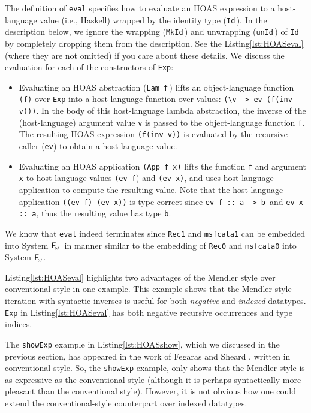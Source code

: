 \documentclass[a4paper,UKenglish]{lipics}
\newcommand{\ie}[0]{{i.e.}}
\newcommand{\Fw}[0]{{\ensuremath{\mathsf{\uppercase{F}}_{\!\omega}}}}
\begin{document}
The definition of \lstinline{eval} specifies how to evaluate
an HOAS expression to a host-language value (\ie, Haskell) wrapped by
the identity type (\lstinline{Id}\,). In the description below, we ignore
the wrapping (\lstinline{MkId}\,) and unwrapping (\lstinline{unId}\,) of
\lstinline{Id} by completely dropping them from the description.
See the Listing\;\ref{lst:HOASeval} (where they are not omitted)
if you care about these details. We discuss the evaluation for each of
the constructors of \lstinline{Exp}:
\begin{itemize}
	\item Evaluating an HOAS abstraction (\lstinline{Lam f}\,) lifts
		an object-language function \lstinline{(f)} over \lstinline{Exp}
		into a host-language function over values:
		\lstinline{(\v -> ev (f(inv v)))}.
		In the body of this host-language lambda abstraction,
		the inverse of the (host-language) argument value \lstinline{v}
		is passed to the object-language function \lstinline{f}.
		The resulting HOAS expression \lstinline{(f(inv v))} is
		evaluated by the recursive caller (\lstinline{ev}) to
		obtain a host-language value.

	\item Evaluating an HOAS application \lstinline{(App f x)} lifts
		the function \lstinline{f} and argument \lstinline{x} to
		host-language values \lstinline{(ev f}) and \lstinline{(ev x)},
		and uses host-language application to compute
		the resulting value. Note that the host-language application
		\lstinline{((ev f) (ev x))} is type correct since
		\lstinline{ev f :: a -> b}\, and \lstinline{ev x :: a},
		thus the resulting value has type \lstinline{b}.
\end{itemize}
We know that \lstinline{eval} indeed terminates since \lstinline{Rec1} and
\lstinline{msfcata1} can be embedded into System \Fw\ in manner similar to
the embedding of \lstinline{Rec0} and \lstinline{msfcata0} into System \Fw.

Listing\;\ref{lst:HOASeval} highlights two advantages of the Mendler style over
conventional style in one example. This example shows that the Mendler-style
iteration with syntactic inverses is useful for both \textit{negative} and
\textit{indexed} datatypes. \lstinline{Exp} in Listing\;\ref{lst:HOASeval} has
both negative recursive occurrences and type indices.

The \lstinline{showExp} example in Listing\;\ref{lst:HOASshow},
which we discussed in the previous section, has appeared in the work
of Fegaras and Sheard \cite{FegShe96}, written in conventional style.
So, the \lstinline{showExp} example, only shows that the Mendler style is
as expressive as the conventional style (although it is
perhaps syntactically more pleasant than the conventional style).
However, it is not obvious how one could extend the conventional-style
counterpart over indexed datatypes.
\end{document}
